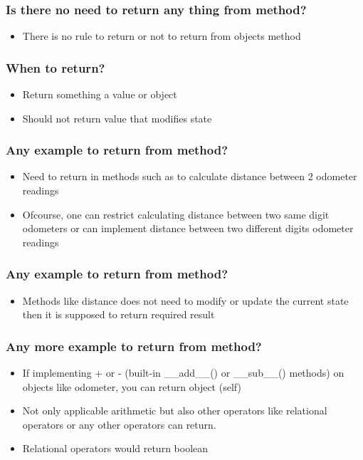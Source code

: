 \documentclass[14pt]{beamer}
\begin{document}
    \begin{frame}[containsverbatim]
        \frametitle{Is there no need to return any thing from method?}
        \begin{itemize}
        \item There is no rule to return or not to return from objects method
        \end{itemize}
    \end{frame}

    \begin{frame}[containsverbatim]
        \frametitle{When to return?}
        \begin{itemize}
        \item Return something a value or object
        \item Should not return value that modifies state
        \end{itemize}
    \end{frame}

    \begin{frame}[containsverbatim]
        \frametitle{Any example to return from method?}
        \begin{itemize}
        \item Need to return in methods such as to calculate distance between 2 odometer readings
        \item Ofcourse, one can restrict calculating distance between two same digit odometers or can implement distance between two different digits odometer readings
        \end{itemize}
    \end{frame}

    \begin{frame}[containsverbatim]
        \frametitle{Any example to return from method?}
        \begin{itemize}
        \item Methods like distance does not need to modify or update the current state then it is supposed to return required result        
        \end{itemize}
    \end{frame}

    \begin{frame}[containsverbatim]
        \frametitle{Any more example to return from method?}
        \begin{itemize}
        \item If implementing + or - (built-in \_\_add\_\_() or \_\_sub\_\_() methods) on objects like odometer, you can return object (self)
        \item Not only applicable arithmetic but also other operators like relational operators or any other operators can return.
        \item Relational operators would return boolean
        \end{itemize}
    \end{frame}
\end{document}
